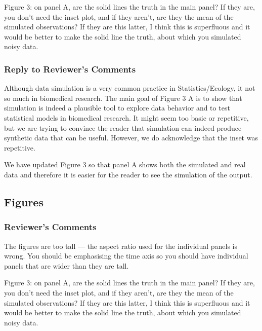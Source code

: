 \documentclass[
]{article}
\begin{document}
Figure 3: on panel A, are the solid lines the truth in the main panel? If they are, you don't need the inset plot, and if they aren't, are they the mean of the simulated observations? If they are this latter, I think this is superfluous and it would be better to make the solid line the truth, about which you simulated noisy data.

\hypertarget{section-16}{%
\subsubsection{\texorpdfstring{\textcolor{reviewersblue} {Reply to Reviewer's Comments}}{}}\label{section-16}}

Although data simulation is a very common practice in Statistics/Ecology, it not so much in biomedical research. The main goal of Figure 3 A is to show that simulation is indeed a plausible tool to explore data behavior and to test statistical models in biomedical research. It might seem too basic or repetitive, but we are trying to convince the reader that simulation can indeed produce synthetic data that can be useful. However, we do acknowledge that the inset was repetitive.

We have updated Figure 3 so that panel A shows both the simulated and real data and therefore it is easier for the reader to see the simulation of the output.

\hypertarget{figures-1}{%
\subsection{Figures}\label{figures-1}}

\hypertarget{reviewers-comments-16}{%
\subsubsection{Reviewer's Comments}\label{reviewers-comments-16}}

The figures are too tall --- the aspect ratio used for the individual panels is wrong. You should be emphasising the time axis so you should have individual panels that are wider than they are tall.

Figure 3: on panel A, are the solid lines the truth in the main panel? If they are, you don't need the inset plot, and if they aren't, are they the mean of the simulated observations? If they are this latter, I think this is superfluous and it would be better to make the solid line the truth, about which you simulated noisy data.
\end{document}
